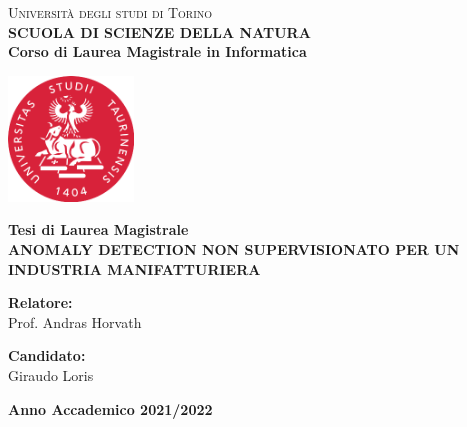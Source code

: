 \begin{titlepage}
\begin{center}
{{\Large{\textsc{Universit\`a degli studi di Torino \\}}}} \vspace{5mm} {\small{\bf SCUOLA DI SCIENZE DELLA NATURA\\ \vspace{3mm}
Corso di Laurea Magistrale in Informatica}}
\vspace{5mm}
\end{center}
\begin{center}
\includegraphics[width=0.25\textwidth]{head/logo.png}
\end{center}
\begin{center}
\vspace{5mm}
{\large{\bf Tesi di Laurea Magistrale\\}}
\vspace{5mm}
{\LARGE{\bf ANOMALY DETECTION NON SUPERVISIONATO PER UN INDUSTRIA MANIFATTURIERA\\}}
\end{center}
\vspace{20mm}
\par
\noindent
\begin{minipage}[t]{0.47\textwidth}
\vspace{20mm}
{\large{\bf Relatore:}\\
Prof. Andras Horvath}
\end{minipage}
\hfill
\begin{minipage}[t]{0.47\textwidth}\raggedleft
\vspace{20mm}
{\large{\bf Candidato:}\\
Giraudo Loris}
\end{minipage}
\vspace{10mm}
\begin{center}
{\large{\bf 
Anno Accademico 2021/2022}}
\end{center}

\end{titlepage}